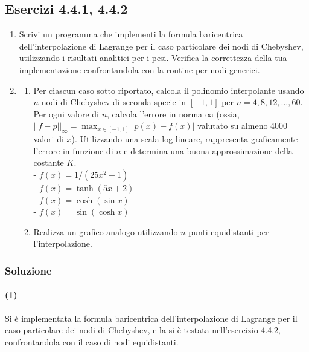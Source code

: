 \documentclass[letterpaper, 12pt]{article}
\numberwithin{equation}{section}    %
\begin{document}
\newpage
\subsection{Esercizi 4.4.1, 4.4.2}

\begin{enumerate}
    \item Scrivi un programma che implementi la formula baricentrica dell'interpolazione di Lagrange 
    per il caso particolare dei nodi di Chebyshev, utilizzando i risultati analitici per i pesi. 
    Verifica la correttezza della tua implementazione confrontandola con la routine per nodi generici.

    \item 
    \begin{enumerate}
        \item Per ciascun caso sotto riportato, calcola il polinomio interpolante usando $n$ nodi di Chebyshev di 
        seconda specie in $[-1,1]$ per $n=4,8,12,\ldots,60$. Per ogni valore di $n$, calcola l'errore in norma $\infty$ 
        (ossia, $||f-p||_\infty=\max_{x\in[-1,1]} |p(x)-f(x)|$ valutato su almeno 4000 valori di $x$). 
        Utilizzando una scala log-lineare, rappresenta graficamente l'errore in funzione di $n$ e determina una 
        buona approssimazione della costante $K$. \\
        - $f(x) = 1/(25x^2+1)$  \\ 
        - $f(x) = \tanh(5 x+2)$ \\ 
        - $f(x) = \cosh(\sin x)$ \\ 
        - $f(x) = \sin(\cosh x)$  \\

        \item Realizza un grafico analogo utilizzando $n$ punti equidistanti per l'interpolazione.
    \end{enumerate}
\end{enumerate}

\subsubsection{Soluzione}
\paragraph{(1)}Si è implementata la formula baricentrica dell'interpolazione di Lagrange per il caso
particolare dei nodi di Chebyshev, e la si è testata nell'esercizio 4.4.2, confrontandola con il caso di 
nodi equidistanti. 
\end{document}
